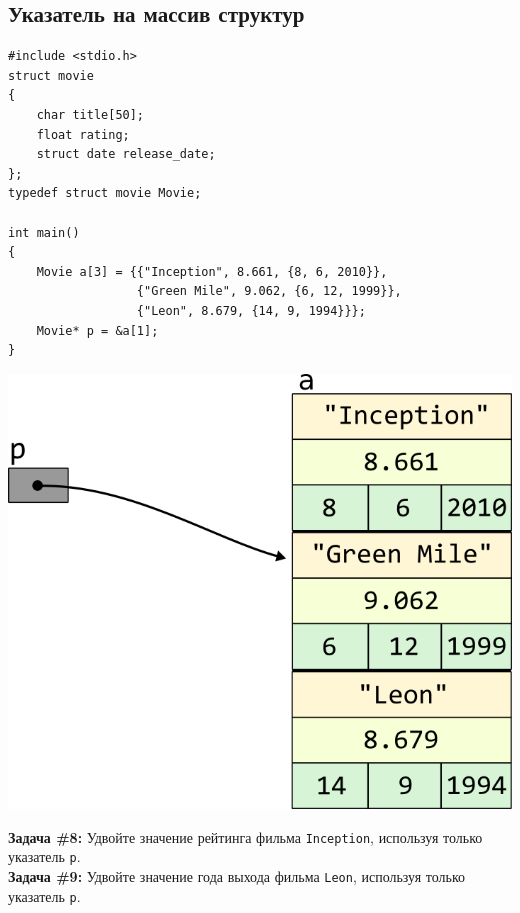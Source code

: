 \documentclass{article}
\begin{document}
\subsection*{Указатель на массив структур}
\begin{lstlisting}
#include <stdio.h>
struct movie
{
	char title[50];
	float rating;
	struct date release_date;
};
typedef struct movie Movie;

int main()
{
	Movie a[3] = {{"Inception", 8.661, {8, 6, 2010}}, 
	              {"Green Mile", 9.062, {6, 12, 1999}}, 
	              {"Leon", 8.679, {14, 9, 1994}}};
	Movie* p = &a[1];
}
\end{lstlisting}

\vspace{-59ex}
\begin{center}
\quad\quad\quad\quad\quad\quad\quad\quad\quad\quad\quad\quad\quad\quad\quad\quad\quad\quad\quad\quad\quad\quad\quad
\includegraphics[scale=1]{../../images/pointer_schemes/pointer_to_array_of_struct_movie.png}
\end{center}
\textbf{Задача \#8:} Удвойте значение рейтинга фильма \texttt{Inception}, используя только указатель \texttt{p}.\\
\textbf{Задача \#9:} Удвойте значение года выхода фильма \texttt{Leon}, используя только указатель \texttt{p}.


\newpage
\end{document}

